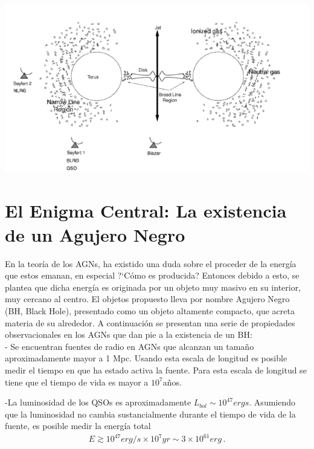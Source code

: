 \includegraphics[scale=.5]{./figures/3_AGNs/Clasificacion_AGN}
\label{fig:Tipos_AGNs_por_observador}



\section{El Enigma Central: La existencia de un Agujero Negro}
\label{sec:Zoo_AGN's}

En la teoría de los AGNs, ha existido una duda sobre el proceder de la energía que estos emanan, en especial ?`Cómo es producida? Entonces debido a esto, se plantea que dicha energía es originada por un objeto muy masivo en su interior, muy cercano al centro. El objetos propuesto lleva por nombre  Agujero Negro (BH, Black Hole), presentado como un objeto altamente compacto, que acreta materia de su alrededor. A continuación se presentan una serie de propiedades observacionales en los AGNs que dan pie a la existencia de un BH: \\

- Se encuentran fuentes de radio en AGNs que alcanzan un tamaño aproximadamente mayor a 1 Mpc. Usando esta escala de longitud es posible medir el tiempo en que ha estado activa la fuente. Para esta escala de longitud se tiene que el tiempo de vida es mayor a $10^{7}$años.

-La luminosidad de los QSOs es aproximadamente $L_{bol}\sim 10^{47}ergs$. Asumiendo que la luminosidad no cambia sustancialmente durante el tiempo de vida de la fuente, es posible medir la energía total
\begin{align}
E \gtrsim 10^{47} erg/s \times 10^{7}yr \sim 3\times 10^{61}erg\,.
\end{align}

